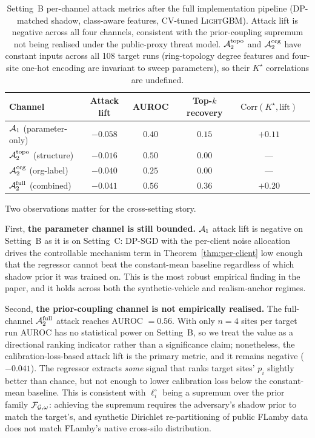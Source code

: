 \begin{table}[h]
\centering
\begin{tabular}{@{}lccccc@{}}
\toprule
Channel & Attack lift & AUROC & Top-$k$ recovery & $\mathrm{Corr}(K^\star, \text{lift})$ \\
\midrule
$\mathcal{A}_1$ (parameter-only)          & $-0.058$ & $0.40$ & $0.15$ & $+0.11$ \\
$\mathcal{A}_2^{\text{topo}}$ (structure) & $-0.016$ & $0.50$ & $0.00$ & ---     \\
$\mathcal{A}_2^{\text{org}}$ (org-label)  & $-0.040$ & $0.25$ & $0.00$ & ---     \\
$\mathcal{A}_2^{\text{full}}$ (combined)  & $-0.041$ & $\mathbf{0.56}$ & $0.36$ & $+0.20$ \\
\bottomrule
\end{tabular}
\caption{Setting~B \TADI per-channel attack metrics after the full
implementation pipeline (DP-matched shadow, class-aware features,
CV-tuned \textsc{LightGBM}). Attack lift is negative across all four
channels, consistent with the prior-coupling supremum not being
realised under the public-proxy threat model.
$\mathcal{A}_2^{\text{topo}}$ and $\mathcal{A}_2^{\text{org}}$ have constant inputs
across all 108 target runs (ring-topology degree features and
four-site one-hot encoding are invariant to sweep parameters), so
their $K^\star$ correlations are undefined.}
\label{tab:channels-b}
\end{table}

Two observations matter for the cross-setting story.

First, \textbf{the parameter channel is still bounded.} $\mathcal{A}_1$
attack lift is negative on Setting~B as it is on Setting~C: DP-SGD
with the per-client noise allocation drives the controllable mechanism
term in Theorem~\ref{thm:per-client} low enough that the regressor
cannot beat the constant-mean baseline regardless of which shadow prior
it was trained on. This is the most robust empirical finding in the
paper, and it holds across both the synthetic-vehicle and realism-anchor
regimes.

Second, \textbf{the prior-coupling channel is not empirically
realised.} The full-channel $\mathcal{A}_2^{\text{full}}$ attack reaches
AUROC $= 0.56$. With only $n=4$ sites per target run AUROC has no
statistical power on Setting~B, so we treat the value as a directional
ranking indicator rather than a significance claim; nonetheless, the
calibration-loss-based attack lift is the primary metric, and it
remains negative ($-0.041$). The regressor extracts \emph{some} signal
that ranks target sites' $p_i$ slightly better than chance, but not
enough to lower calibration loss below the constant-mean baseline.
This is consistent with
$\ell_i^\circ$ being a supremum over the prior family
$\mathcal{F}_{\mathcal{G},\omega}$: achieving the supremum requires the
adversary's shadow prior to match the target's, and synthetic
Dirichlet re-partitioning of public FLamby data does not match
FLamby's native cross-silo distribution.

